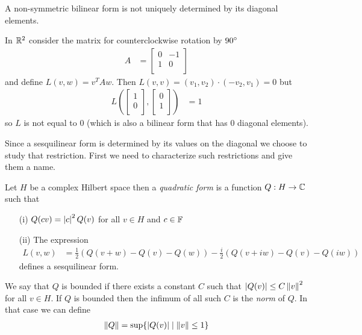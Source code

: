 A non-symmetric bilinear form is not uniquely determined by its diagonal elements.
\begin{examp}In $\mathbb{R}^2$ consider the matrix for counterclockwise rotation by $90{\degree}$
\begin{align*}
A &= \begin{bmatrix} 
0 & -1 \\ 
1 & 0 \\
\end{bmatrix}
\end{align*}
and define $L(v,w) = v^T A w$.  Then $L(v,v) = (v_1,v_2) \cdot (-v_2, v_1) = 0$ but 
\begin{align*}
L \left( \begin{bmatrix} 
1 \\ 
0 \\
\end{bmatrix},
\begin{bmatrix} 
0 \\ 
1 \\
\end{bmatrix}
\right) &= 1
\end{align*}
so $L$ is not equal to $0$ (which is also a bilinear form that has $0$ diagonal elements).
\end{examp}

Since a sesquilinear form is determined by its values on the diagonal we choose to study that restriction.  First we need to characterize such restrictions and give them a name.
\begin{defn}Let $H$ be a complex Hilbert space then a \emph{quadratic form} is a function $Q : H \to \mathbb{C}$ such that 
\begin{itemize}
\item[(i)] $Q(c v) = \left \vert c \right \vert^2 Q(v)$ for all $v \in H$ and $c \in \mathbb{F}$
\item[(ii)] The expression
\begin{align*}
L(v,w) &= \frac{1}{2} \left ( Q(v+w) - Q(v) - Q(w) \right) - \frac{i}{2} \left (Q(v+iw) - Q(v) - Q(iw) \right) 
\end{align*}
defines a sesquilinear form.
\end{itemize}
We say that $Q$ is bounded if there exists a constant $C$ such that $\left \vert Q(v) \right \vert \leq C \left \lVert v \right \rVert^2$ for all $v \in H$.  If $Q$ is bounded then the infimum of all such $C$ is the \emph{norm} of $Q$.  In that case we can define 
\begin{align*}
\left \lVert Q \right \rVert = \sup \lbrace \left \vert Q(v) \right \vert \mid \left \lVert v \right \rVert \leq 1 \rbrace
\end{align*}
\end{defn}

